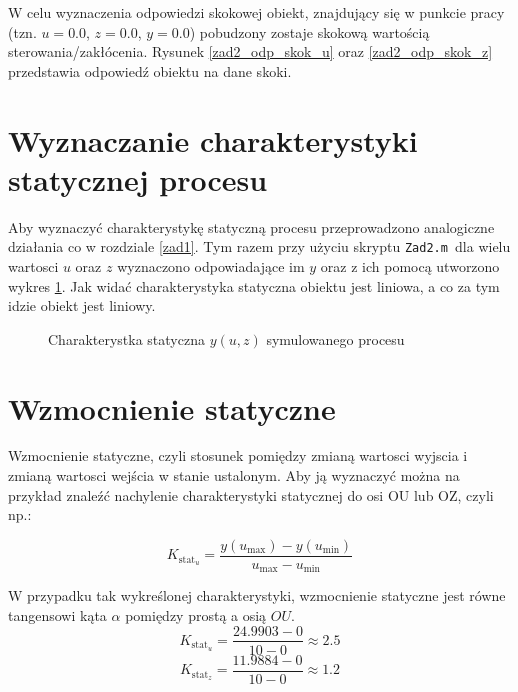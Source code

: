 W celu wyznaczenia odpowiedzi skokowej obiekt, znajdujący się w punkcie pracy (tzn. $u= \num{0.0}$, $z= \num{0.0}$, $y= \num{0.0}$) pobudzony zostaje skokową wartością sterowania/zakłócenia. Rysunek \ref{zad2_odp_skok_u} oraz \ref{zad2_odp_skok_z} przedstawia odpowiedź obiektu na dane skoki.

\section{Wyznaczanie charakterystyki statycznej procesu}
\label{zad2_char_stat}
Aby wyznaczyć charakterystykę statyczną procesu przeprowadzono analogiczne działania co w rozdziale \ref{zad1}. Tym razem przy użyciu skryptu \verb+Zad2.m +dla wielu wartosci $u$ oraz $z$ wyznaczono odpowiadające im $y$ oraz z ich pomocą utworzono wykres \ref{zad2_char_stat}. Jak widać charakterystyka statyczna obiektu jest liniowa, a co za tym idzie obiekt jest liniowy.

\begin{figure}[b]   
     \label{zad2_char_stat}
    \centering
    
    \caption{Charakterystka statyczna $y(u,z)$ symulowanego procesu}

\end{figure}

\section{Wzmocnienie statyczne}
\label{zad2_wzmocnienie}
Wzmocnienie statyczne, czyli stosunek pomiędzy zmianą wartosci wyjscia i zmianą wartosci wejścia w stanie ustalonym. Aby ją wyznaczyć można na przykład znaleźć nachylenie charakterystyki statycznej do osi OU lub OZ, czyli np.:

\begin{equation}
K_{\mathrm{stat}_u} = \frac{y(u_{\mathrm{max}})- y(u_{\mathrm{min}})}{u_{\mathrm{max}}- u_{\mathrm{min}}}
\label{zad2_wzm_statyczne_wzor}
\end{equation}

W przypadku tak wykreślonej charakterystyki, wzmocnienie statyczne jest równe tangensowi kąta $\alpha$
pomiędzy prostą a osią $OU$. 
\begin{equation}
K_{\mathrm{stat}_u} = \frac{24.9903- 0}{10- 0}\approx 2.5
\label{zad2_wzm_statyczne_u}
\end{equation}
\begin{equation}
K_{\mathrm{stat}_z} = \frac{11.9884- 0}{10- 0}\approx 1.2
\label{zad2_wzm_statyczne_z}
\end{equation}
